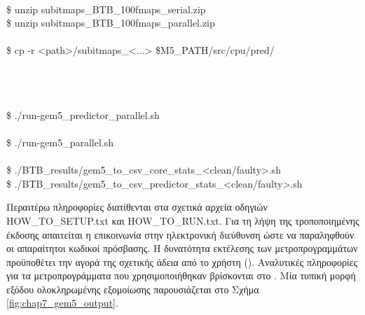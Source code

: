 \begin{center}
\begin{tcolorbox}[width=\linewidth]
         \\
        \$ unzip subitmaps\_BTB\_100fmaps\_serial.zip \\
        \$ unzip subitmaps\_BTB\_100fmaps\_parallel.zip \\
        
         \\
        \$ cp -r <path>/subitmaps\_<...> \$M5\_PATH/src/cpu/pred/
    \end{tcolorbox}
\end{center}

\begin{center}
    \begin{tcolorbox}[width=\linewidth]
        \ttfamily
         \\
         \\
        
         \\
        \$ ./run-gem5\_predictor\_parallel.sh \\
         \\
        \$ ./run-gem5\_parallel.sh \\
        
         \\
        \$ ./BTB\_results/gem5\_to\_csv\_core\_stats\_<clean/faulty>.sh \\
        \$ ./BTB\_results/gem5\_to\_csv\_predictor\_stats\_<clean/faulty>.sh
    \end{tcolorbox}
\end{center}

Περαιτέρω πληροφορίες διατίθενται στα σχετικά αρχεία οδηγιών \textlatin{HOW\_TO\_SETUP.txt} και \textlatin{HOW\_TO\_RUN.txt}. Για τη λήψη της τροποποιημένης έκδοσης απαιτείται η επικοινωνία στην ηλεκτρονική διεύθυνση \en{\email} ώστε να παραληφθούν οι απαραίτητοι κωδικοί πρόσβασης. Η δυνατότητα εκτέλεσης των μετροπρογραμμάτων \spec προϋποθέτει την αγορά της σχετικής άδεια από το χρήστη (). Αναλυτικές πληροφορίες για τα μετροπρογράμματα που χρησιμοποιήθηκαν βρίσκονται στο \cite{henning2006spec}. Μία τυπική μορφή εξόδου ολοκληρωμένης εξομοίωσης παρουσιάζεται στο Σχήμα \ref{fig:chap7_gem5_output}.


